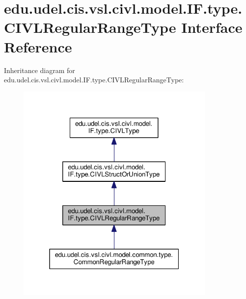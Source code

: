 \hypertarget{interfaceedu_1_1udel_1_1cis_1_1vsl_1_1civl_1_1model_1_1IF_1_1type_1_1CIVLRegularRangeType}{}\section{edu.\+udel.\+cis.\+vsl.\+civl.\+model.\+I\+F.\+type.\+C\+I\+V\+L\+Regular\+Range\+Type Interface Reference}
\label{interfaceedu_1_1udel_1_1cis_1_1vsl_1_1civl_1_1model_1_1IF_1_1type_1_1CIVLRegularRangeType}


Inheritance diagram for edu.\+udel.\+cis.\+vsl.\+civl.\+model.\+I\+F.\+type.\+C\+I\+V\+L\+Regular\+Range\+Type\+:
\nopagebreak
\begin{figure}[H]
\begin{center}
\leavevmode
\includegraphics[width=277pt]{interfaceedu_1_1udel_1_1cis_1_1vsl_1_1civl_1_1model_1_1IF_1_1type_1_1CIVLRegularRangeType__inherit__graph}
\end{center}
\end{figure}


